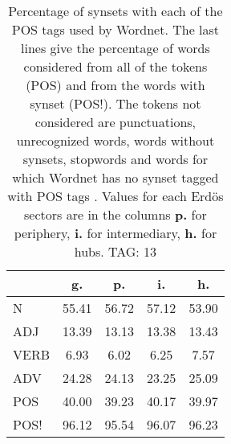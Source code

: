 \begin{table}[h!]
\begin{center}
\begin{tabular}{| l | c | c | c | c |}\hline
 & g. & p. & i. & h. \\\hline
N & 55.41  & 56.72  & 57.12  & 53.90 \\\hline
ADJ & 13.39  & 13.13  & 13.38  & 13.43 \\\hline
VERB & 6.93  & 6.02  & 6.25  & 7.57 \\\hline
ADV & 24.28  & 24.13  & 23.25  & 25.09 \\\hline
POS & 40.00  & 39.23  & 40.17  & 39.97 \\\hline
POS! & 96.12  & 95.54  & 96.07  & 96.23 \\\hline
\end{tabular}
\caption{Percentage of synsets with each of the POS tags used by Wordnet. The last lines give the percentage of words considered from all of the tokens (POS) and from the words with synset (POS!). The tokens not considered are punctuations, unrecognized words, words without synsets, stopwords and words for which Wordnet has no synset  tagged with POS tags . Values for each Erd\"os sectors are in the columns {{\bf p.}} for periphery, {{\bf i.}} for intermediary, {{\bf h.}} for hubs. TAG: 13}
\end{center}
\end{table}
